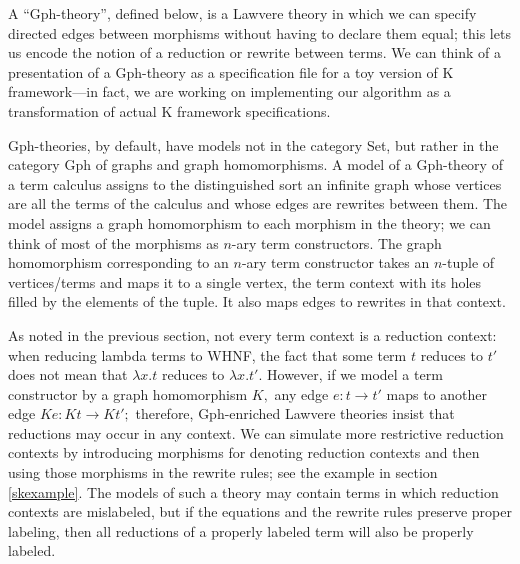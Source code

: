 \documentclass[submission,copyright,creativecommons]{eptcs}
\newcommand{\maps}{\colon}
\begin{document}
A ``Gph-theory'', defined below, is a Lawvere theory in which we can specify directed edges between morphisms without having to declare them equal; this lets us encode the notion of a reduction or rewrite between terms.  We can think of a presentation of a Gph-theory as a specification file for a toy version of K framework---in fact, we are working on implementing our algorithm as a transformation of actual K framework specifications.

Gph-theories, by default, have models not in the category Set, but rather in the category Gph of graphs and graph homomorphisms.  A model of a Gph-theory of a term calculus assigns to the distinguished sort an infinite graph whose vertices are all the terms of the calculus and whose edges are rewrites between them.  The model assigns a graph homomorphism to each morphism in the theory; we can think of most of the morphisms as $n\mbox{-}$ary term constructors.  The graph homomorphism corresponding to an $n\mbox{-}$ary term constructor takes an $n\mbox{-}$tuple of vertices/terms and maps it to a single vertex, the term context with its holes filled by the elements of the tuple.  It also maps edges to rewrites in that context.

As noted in the previous section, not every term context is a reduction context: when reducing lambda terms to WHNF, the fact that some term $t$ reduces to $t'$ does not mean that $\lambda x.t$ reduces to $\lambda x.t'.$  However, if we model a term constructor by a graph homomorphism $K,$ any edge $e\maps t \to t'$ maps to another edge $Ke\maps Kt \to Kt';$ therefore, Gph-enriched Lawvere theories insist that reductions may occur in any context.  We can simulate more restrictive reduction contexts by introducing morphisms for denoting reduction contexts and then using those morphisms in the rewrite rules; see the example in section \ref{skexample}.  The models of such a theory may contain terms in which reduction contexts are mislabeled, but if the equations and the rewrite rules preserve proper labeling, then all reductions of a properly labeled term will also be properly labeled.
\end{document}
